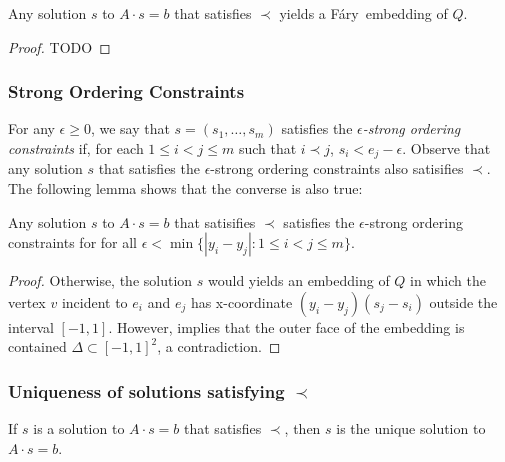 \documentclass{patmorin}
\newcommand{\Fary}{Fáry}
\begin{document}
\begin{lem}
   Any solution $s$ to $A\cdot s=b$ that satisfies $\prec$ yields a
   \Fary\ embedding of $Q$.
\end{lem}

\begin{proof}
TODO
\end{proof}


\subsubsection{Strong Ordering Constraints}

For any $\epsilon \ge 0$, we say that $s=(s_1,\ldots,s_m)$ satisfies
the \emph{$\epsilon$-strong ordering constraints} if, for each $1\le
i<j\le m$ such that $i\prec j$, $s_i < e_j - \epsilon$.  Observe that any
solution $s$ that satisfies the $\epsilon$-strong ordering constraints
also satisifies $\prec$. The following lemma shows that the converse is
also true:

\begin{lem}
   Any solution $s$ to $A\cdot s=b$ that satisifies $\prec$ satisfies the
   $\epsilon$-strong ordering constraints for
   for all $\epsilon<\min\{|y_i-y_j| : 1\le i< j\le m\}$.
\end{lem}

\begin{proof}
   Otherwise, the solution $s$ would yields an embedding of $Q$ in
   which the vertex $v$ incident to $e_i$ and $e_j$ has x-coordinate
   $(y_i-y_j)(s_j-s_i)$ outside the interval $[-1,1]$. However,
    implies that the outer face of the
   embedding is contained $\Delta\subset[-1,1]^2$, a contradiction.
\end{proof}

\subsubsection{Uniqueness of solutions satisfying $\prec$}

\begin{lem}
   If $s$ is a solution to $A\cdot s=b$ that satisfies $\prec$, then $s$ is 
   the unique solution to $A\cdot s=b$.
\end{lem}
\end{document}
